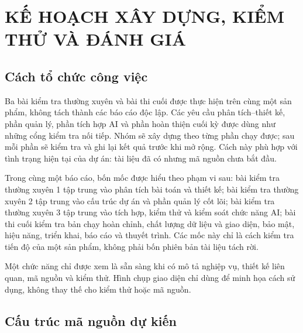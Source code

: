 \chapter{KẾ HOẠCH XÂY DỰNG, KIỂM THỬ VÀ ĐÁNH GIÁ}

\section{Cách tổ chức công việc}

Ba bài kiểm tra thường xuyên và bài thi cuối được thực hiện trên cùng một sản phẩm, không tách thành các báo cáo độc lập. Các yêu cầu phân tích--thiết kế, phần quản lý, phần tích hợp AI và phần hoàn thiện cuối kỳ được dùng như những cổng kiểm tra nối tiếp. Nhóm sẽ xây dựng theo từng phần chạy được; sau mỗi phần sẽ kiểm tra và ghi lại kết quả trước khi mở rộng. Cách này phù hợp với tình trạng hiện tại của dự án: tài liệu đã có nhưng mã nguồn chưa bắt đầu.

Trong cùng một báo cáo, bốn mốc được hiểu theo phạm vi sau: bài kiểm tra thường xuyên 1 tập trung vào phân tích bài toán và thiết kế; bài kiểm tra thường xuyên 2 tập trung vào cấu trúc dự án và phần quản lý cốt lõi; bài kiểm tra thường xuyên 3 tập trung vào tích hợp, kiểm thử và kiểm soát chức năng AI; bài thi cuối kiểm tra bản chạy hoàn chỉnh, chất lượng dữ liệu và giao diện, bảo mật, hiệu năng, triển khai, báo cáo và thuyết trình. Các mốc này chỉ là cách kiểm tra tiến độ của một sản phẩm, không phải bốn phiên bản tài liệu tách rời.

Một chức năng chỉ được xem là sẵn sàng khi có mô tả nghiệp vụ, thiết kế liên quan, mã nguồn và kiểm thử. Hình chụp giao diện chỉ dùng để minh họa cách sử dụng, không thay thế cho kiểm thử hoặc mã nguồn.

\section{Cấu trúc mã nguồn dự kiến}

